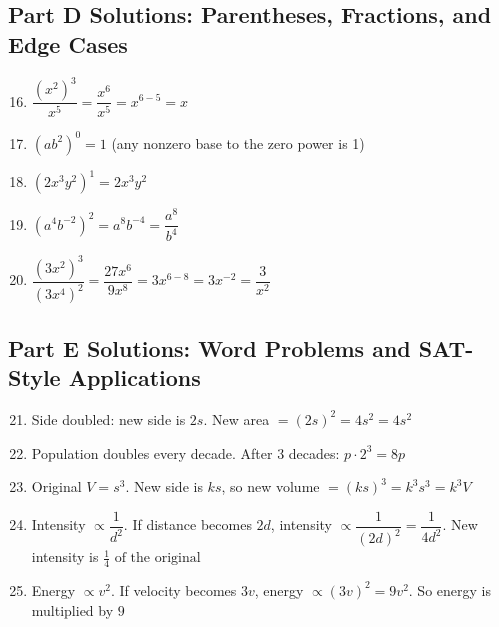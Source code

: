 \documentclass[12pt]{article}
\begin{document}
\subsection*{Part D Solutions: Parentheses, Fractions, and Edge Cases}
\begin{enumerate}
  \setcounter{enumi}{15}
  \item \(\dfrac{(x^2)^3}{x^5} = \dfrac{x^6}{x^5} = x^{6-5} = \boxed{x}\)
  \item \((ab^2)^0 = \boxed{1}\) \quad (any nonzero base to the zero power is 1)
  \item \((2x^3 y^2)^1 = \boxed{2x^3 y^2}\)
  \item \((a^4 b^{-2})^2 = a^{8} b^{-4} = \boxed{\dfrac{a^8}{b^4}}\)
  \item \(\dfrac{(3x^2)^3}{(3x^4)^2} = \dfrac{27x^6}{9x^8} = 3x^{6-8} = 3x^{-2} = \boxed{\dfrac{3}{x^2}}\)
\end{enumerate}

\subsection*{Part E Solutions: Word Problems and SAT-Style Applications}
\begin{enumerate}
  \setcounter{enumi}{20}
  \item Side doubled: new side is \(2s\). New area \(=(2s)^2 = 4s^2 = \boxed{4s^2}\)
  \item Population doubles every decade. After 3 decades: \(p \cdot 2^3 = \boxed{8p}\)
  \item Original \(V = s^3\). New side is \(ks\), so new volume \(=(ks)^3 = k^3 s^3 = \boxed{k^3 V}\)
  \item Intensity \(\propto \dfrac{1}{d^2}\). If distance becomes \(2d\), intensity \(\propto \dfrac{1}{(2d)^2} = \dfrac{1}{4d^2}\). New intensity is \(\boxed{\tfrac{1}{4}\text{ of the original}}\)
  \item Energy \(\propto v^2\). If velocity becomes \(3v\), energy \(\propto (3v)^2 = 9v^2\). So energy is multiplied by \(\boxed{9}\)
\end{enumerate}
\end{document}
